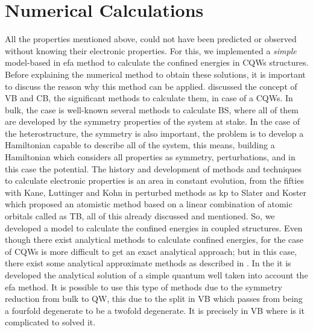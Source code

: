 \section{Numerical Calculations}
\label{sec:chapter-2-numerical-calculations}
\vspace{-10mm} 
All the properties mentioned above, could not have been predicted or observed without  knowing their electronic properties. For this, we implemented a \emph{simple} model-based in \gls{efa} method to calculate the confined energies in \gls{CQWs} structures. Before explaining the numerical method to obtain these solutions, it is important to discuss the reason why this method can be applied.   discussed  the concept of \gls{VB} and \gls{CB},  the significant methods to calculate them, in case of a  \gls{CQWs}. In bulk, the case is well-known several methods to calculate \gls{BS}, where all of them are developed by the symmetry properties of the system at stake. In the case of the heterostructure, the symmetry is also important, the problem is to develop a Hamiltonian capable to describe all of the system, this means, building a Hamiltonian which considers all properties as symmetry, perturbations, and in this case the potential. 
The history and development of methods and techniques to calculate electronic properties is an area in constant evolution, from the fifties with Kane\cite{kane1957bandstructure}, Luttinger and Kohn\cite{Luttinger1955motion} in perturbed methods as \gls{kp} to Slater and Koster\cite{slater1954simplified} which proposed an atomistic method based on a linear combination of atomic orbitals called as \gls{TB}, all of this already discussed and mentioned. So, we developed a model to calculate the confined energies in coupled structures. Even though there exist analytical methods to calculate confined energies, for the case of \gls{CQWs} is more difficult to get an exact analytical  approach; but in this case, there exist some analytical approximate methods as described in \cite{yariv1985approximate,fromherz1997floquet,rosencher2002optoelectronics}.
In the  it is developed the analytical solution of a simple quantum well taken into account the \gls{efa} method. It is possible to use this type of methods due to the symmetry reduction from bulk to QW, this due to the split in \gls{VB} which passes from being a fourfold degenerate to be a twofold degenerate. It is precisely in \gls{VB} where is it complicated to solved it. 


